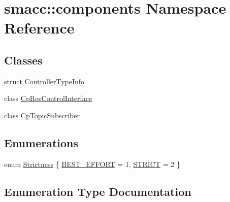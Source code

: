 \hypertarget{namespacesmacc_1_1components}{}\section{smacc\+:\+:components Namespace Reference}
\label{namespacesmacc_1_1components}
\subsection*{Classes}
\begin{DoxyCompactItemize}
\item 
struct \hyperlink{structsmacc_1_1components_1_1ControllerTypeInfo}{Controller\+Type\+Info}
\item 
class \hyperlink{classsmacc_1_1components_1_1CpRosControlInterface}{Cp\+Ros\+Control\+Interface}
\item 
class \hyperlink{classsmacc_1_1components_1_1CpTopicSubscriber}{Cp\+Topic\+Subscriber}
\end{DoxyCompactItemize}
\subsection*{Enumerations}
\begin{DoxyCompactItemize}
\item 
enum \hyperlink{namespacesmacc_1_1components_a18117d6a71feb2471fb4e07f47674e4c}{Strictness} \{ \hyperlink{namespacesmacc_1_1components_a18117d6a71feb2471fb4e07f47674e4cac068971243fbd65b8e03256ec6cc3ca7}{B\+E\+S\+T\+\_\+\+E\+F\+F\+O\+RT} = 1, 
\hyperlink{namespacesmacc_1_1components_a18117d6a71feb2471fb4e07f47674e4ca659b52150977b11ffc0fa1d7f1f30a01}{S\+T\+R\+I\+CT} = 2
 \}
\end{DoxyCompactItemize}


\subsection{Enumeration Type Documentation}
